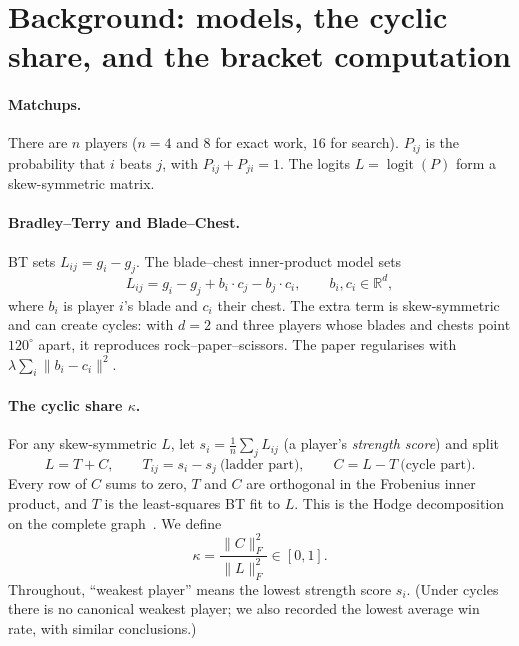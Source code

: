 \documentclass[11pt]{article}
\theoremstyle{remark}
\newcommand{\kap}{\kappa}
\begin{document}
\section{Background: models, the cyclic share, and the bracket computation}
\label{sec:background}

\paragraph{Matchups.} There are $n$ players ($n=4$ and $8$ for exact work, $16$ for search). $P_{ij}$ is the probability that
$i$ beats $j$, with $P_{ij}+P_{ji}=1$. The logits $L=\operatorname{logit}(P)$ form a skew-symmetric matrix.

\paragraph{Bradley--Terry and Blade--Chest.} BT sets $L_{ij}=g_i-g_j$. The blade--chest inner-product model
\cite[eq.~4]{chen2016blade} sets
\begin{equation}
L_{ij} = g_i - g_j + b_i\!\cdot c_j - b_j\!\cdot c_i, \qquad b_i, c_i\in\mathbb{R}^d,
\end{equation}
where $b_i$ is player $i$'s blade and $c_i$ their chest. The extra term is skew-symmetric and can create cycles: with $d=2$
and three players whose blades and chests point $120^\circ$ apart, it reproduces rock--paper--scissors. The paper regularises
with $\lambda\sum_i\|b_i-c_i\|^2$.

\paragraph{The cyclic share $\kap$.} For any skew-symmetric $L$, let $s_i = \frac1n\sum_j L_{ij}$ (a player's \emph{strength
score}) and split
\begin{equation}
L = T + C,\qquad T_{ij}=s_i-s_j\ \text{(ladder part)},\qquad C = L-T\ \text{(cycle part)}.
\end{equation}
Every row of $C$ sums to zero, $T$ and $C$ are orthogonal in the Frobenius inner product, and $T$ is the least-squares BT fit
to $L$. This is the Hodge decomposition on the complete graph~\cite{jiang2011hodge}. We define
\begin{equation}
\kap = \frac{\|C\|_F^2}{\|L\|_F^2}\in[0,1].
\end{equation}
Throughout, ``weakest player'' means the lowest strength score $s_i$. (Under cycles there is no canonical weakest player; we
also recorded the lowest average win rate, with similar conclusions.)
\end{document}
